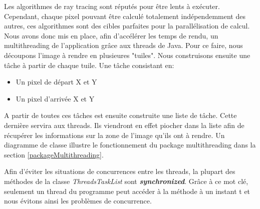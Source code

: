 \documentclass[../../Rapport RayTracer.tex]{subfiles}
\begin{document}
\label{multithreading}
Les algorithmes de ray tracing sont réputés pour être lents à exécuter. Cependant, chaque pixel pouvant être calculé totalement indépendemment des autres, ces algorithmes sont des cibles parfaites pour la parallélisation de calcul. Nous avons donc mis en place, afin d'accélérer les temps de rendu, un multithreading de l'application grâce aux threads de Java. Pour ce faire, nous découpons l'image à rendre en plusieures "tuiles". Nous construisons ensuite une tâche à partir de chaque tuile. Une tâche consistant en:
\begin{itemize}
	\item{Un pixel de départ X et Y}	
	\item{Un pixel d'arrivée X et Y}
\end{itemize}
A partir de toutes ces tâches est ensuite construite une liste de tâche. Cette dernière servira aux threads. Ils viendront en effet piocher dans la liste afin de récupérer les informations sur la zone de l'image qu'ils ont à rendre.
Un diagramme de classe illustre le fonctionnement du package multithreading dans la section \ref{packageMultithreading}.

Afin d'éviter les situations de concurrences entre les threads, la plupart des méthodes de la classe \textit{ThreadsTaskList} sont \textit{\textbf{synchronized}}. Grâce à ce mot clé, seulement un thread du programme peut accéder à la méthode à un instant t et nous évitons ainsi les problèmes de concurrence.
\end{document}

